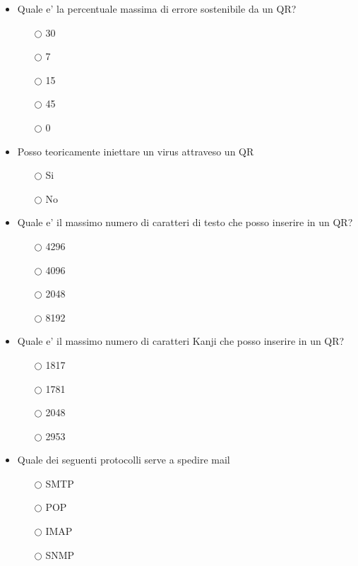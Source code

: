 \documentclass[10pt,twocolumn]{article}
\begin{document}
\begin{itemize}
    \item Quale e' la percentuale massima di errore sostenibile da un QR?
          \begin{itemize}
              \item[$\bigcirc$] 30
              \item[$\bigcirc$] 7
              \item[$\bigcirc$] 15
              \item[$\bigcirc$] 45
              \item[$\bigcirc$] 0
          \end{itemize}
\end{itemize}
\begin{itemize}
    \item Posso teoricamente iniettare un virus attraveso un QR
          \begin{itemize}
              \item[$\bigcirc$] Si
              \item[$\bigcirc$] No
          \end{itemize}
\end{itemize}
\begin{itemize}
    \item Quale e' il massimo numero di caratteri di testo che posso inserire in un QR?
          \begin{itemize}
              \item[$\bigcirc$] 4296
              \item[$\bigcirc$] 4096
              \item[$\bigcirc$] 2048
              \item[$\bigcirc$] 8192
          \end{itemize}
\end{itemize}
\begin{itemize}
    \item Quale e' il massimo numero di caratteri Kanji che posso inserire in un QR?
          \begin{itemize}
              \item[$\bigcirc$] 1817
              \item[$\bigcirc$] 1781
              \item[$\bigcirc$] 2048
              \item[$\bigcirc$] 2953
          \end{itemize}
\end{itemize}
\begin{itemize}
    \item Quale dei seguenti protocolli serve a spedire mail
          \begin{itemize}
              \item[$\bigcirc$] SMTP
              \item[$\bigcirc$] POP
              \item[$\bigcirc$] IMAP
              \item[$\bigcirc$] SNMP
          \end{itemize}
\end{itemize}
\end{document}
